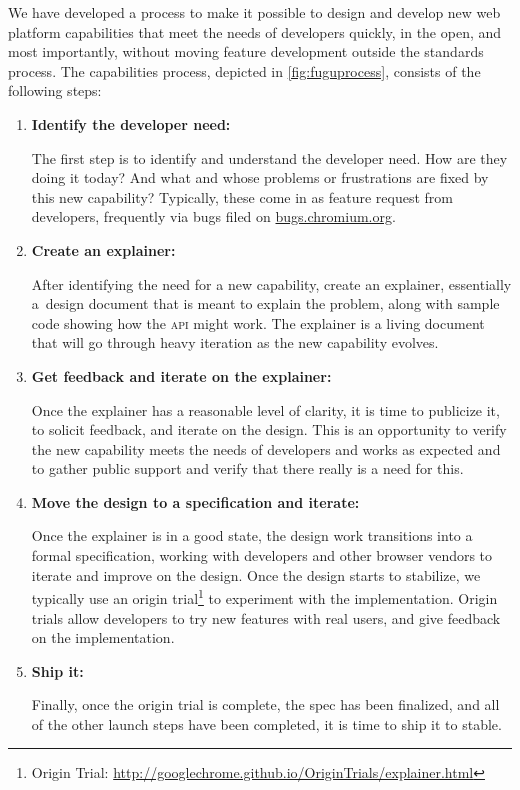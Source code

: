 \documentclass[sigconf]{acmart}
\begin{document}
We have developed a process to make it possible to design and develop
new web platform capabilities that meet the needs of developers quickly,
in the open, and most importantly, without moving feature development outside the standards process.
The capabilities process, depicted in \autoref{fig:fuguprocess}, consists of the following steps:

\begin{enumerate}
  \item \textbf{Identify the developer need:}
  
  The first step is to identify and understand the developer need.
  How are they doing it today? And what and whose problems or frustrations
  are fixed by this new capability? Typically, these come in as feature request
  from developers, frequently via bugs filed on \url{bugs.chromium.org}.

  \item \textbf{Create an explainer:}

  After identifying the need for a new capability, create an explainer,
  essentially a~design document that is meant to explain the problem,
  along with sample code showing how the \textsc{api} might work.
  The explainer is a living document that will go through heavy iteration
  as the new capability evolves.

  \item \textbf{Get feedback and iterate on the explainer:}

  Once the explainer has a reasonable level of clarity,
  it is time to publicize it, to solicit feedback, and iterate on the design.
  This is an opportunity to verify the new capability meets the needs of developers
  and works as expected and to gather public support and verify
  that there really is a need for this.

  \item \textbf{Move the design to a specification and iterate:}
  
  Once the explainer is in a good state,
  the design work transitions into a formal specification,
  working with developers and other browser vendors to iterate and improve on the design.
  Once the design starts to stabilize, we typically use an
  origin trial\footnote{Origin Trial: \url{http://googlechrome.github.io/OriginTrials/explainer.html}}
  to experiment with the implementation.
  Origin trials allow developers to try new features with real users,
  and give feedback on the implementation.

  \item \textbf{Ship it:}

  Finally, once the origin trial is complete, the spec has been finalized,
  and all of the other launch steps have been completed, it is time to ship it to stable.  
\end{enumerate}
\end{document}
